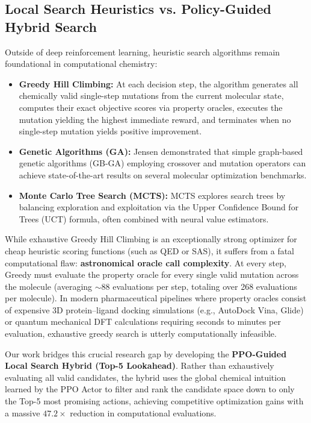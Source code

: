 \documentclass{ieeeaccess}
\begin{document}
\subsection{Local Search Heuristics vs. Policy-Guided Hybrid Search}
Outside of deep reinforcement learning, heuristic search algorithms remain foundational in computational chemistry:
\begin{itemize}
    \item \textbf{Greedy Hill Climbing:} At each decision step, the algorithm generates all chemically valid single-step mutations from the current molecular state, computes their exact objective scores via property oracles, executes the mutation yielding the highest immediate reward, and terminates when no single-step mutation yields positive improvement.
    \item \textbf{Genetic Algorithms (GA):} Jensen \cite{jensen2019} demonstrated that simple graph-based genetic algorithms (GB-GA) employing crossover and mutation operators can achieve state-of-the-art results on several molecular optimization benchmarks.
    \item \textbf{Monte Carlo Tree Search (MCTS):} MCTS explores search trees by balancing exploration and exploitation via the Upper Confidence Bound for Trees (UCT) formula, often combined with neural value estimators.
\end{itemize}

While exhaustive Greedy Hill Climbing is an exceptionally strong optimizer for cheap heuristic scoring functions (such as QED or SAS), it suffers from a fatal computational flaw: \textbf{astronomical oracle call complexity}. At every step, Greedy must evaluate the property oracle for every single valid mutation across the molecule (averaging $\sim88$ evaluations per step, totaling over 268 evaluations per molecule). In modern pharmaceutical pipelines where property oracles consist of expensive 3D protein--ligand docking simulations (e.g., AutoDock Vina, Glide) or quantum mechanical DFT calculations requiring seconds to minutes per evaluation, exhaustive greedy search is utterly computationally infeasible.

Our work bridges this crucial research gap by developing the \textbf{PPO-Guided Local Search Hybrid (Top-5 Lookahead)}. Rather than exhaustively evaluating all valid candidates, the hybrid uses the global chemical intuition learned by the PPO Actor to filter and rank the candidate space down to only the Top-5 most promising actions, achieving competitive optimization gains with a massive $47.2\times$ reduction in computational evaluations.
\end{document}
